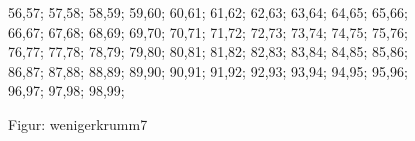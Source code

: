 \documentclass[a4paper,10pt,ngerman]{scrartcl}
\begin{document}
\begin{figure}[!h]
{            56,57;
            57,58;
            58,59;
            59,60;
            60,61;
            61,62;
            62,63;
            63,64;
            64,65;
            65,66;
            66,67;
            67,68;
            68,69;
            69,70;
            70,71;
            71,72;
            72,73;
            73,74;
            74,75;
            75,76;
            76,77;
            77,78;
            78,79;
            79,80;
            80,81;
            81,82;
            82,83;
            83,84;
            84,85;
            85,86;
            86,87;
            87,88;
            88,89;
            89,90;
            90,91;
            91,92;
            92,93;
            93,94;
            94,95;
            95,96;
            96,97;
            97,98;
            98,99;
        }
        \caption{Figur: wenigerkrumm7}
        \label{fig:wenigerkrumm7}
    \end{figure}
    \newpage
\end{document}
